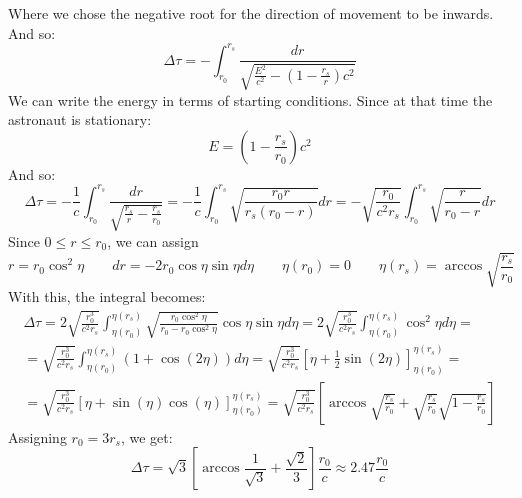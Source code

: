 \documentclass{article}
\begin{document}
Where we chose the negative root for the direction of movement to be inwards. And so:
\begin{equation}
    \Delta \tau = -\int_{r_0}^{r_s} \frac{dr}{\sqrt{\frac{E^2}{c^2} - \left(1 - \frac{r_s}{r}\right)c^2}}
\end{equation}
We can write the energy in terms of starting conditions. Since at that time the astronaut is stationary:
\begin{equation}
    E = \left(1 - \frac{r_s}{r_0}\right)c^2
\end{equation}
And so:
\begin{equation}
    \Delta \tau = -\frac{1}{c}\int_{r_0}^{r_s} \frac{dr}{\sqrt{\frac{r_s}{r} - \frac{r_s}{r_0}}} = -\frac{1}{c}\int_{r_0}^{r_s} \sqrt{\frac{r_0r}{r_s(r_0 - r)}}dr = 
    -\sqrt{\frac{r_0}{c^2r_s}}\int_{r_0}^{r_s} \sqrt{\frac{r}{r_0 - r}}dr
\end{equation}
Since $0 \le r \le r_0$, we can assign
\begin{equation}
    r = r_0 \cos^2 \eta
    \qquad
    dr = -2 r_0\cos\eta\sin\eta d\eta
    \qquad
    \eta(r_0) = 0
    \qquad
    \eta(r_s) = \arccos{\sqrt{\frac{r_s}{r_0}}}
\end{equation}
With this, the integral becomes:
\begin{equation}
\begin{gathered}
    \Delta \tau = 2\sqrt{\frac{r_0^3}{c^2r_s}}\int_{\eta(r_0)}^{\eta(r_s)} \sqrt{\frac{r_0\cos^2\eta}{r_0 - r_0\cos^2\eta}}\cos\eta\sin\eta d\eta
    = 2\sqrt{\frac{r_0^3}{c^2r_s}}\int_{\eta(r_0)}^{\eta(r_s)} \cos^2\eta d\eta = \\ =
    \sqrt{\frac{r_0^3}{c^2r_s}}\int_{\eta(r_0)}^{\eta(r_s)} \left(1 + \cos(2\eta)\right) d\eta =
    \sqrt{\frac{r_0^3}{c^2r_s}} \left[\eta + \frac{1}{2}\sin(2\eta)\right]_{\eta(r_0)}^{\eta(r_s)} = \\ = \sqrt{\frac{r_0^3}{c^2r_s}} \left[\eta + \sin(\eta)\cos(\eta)\right]_{\eta(r_0)}^{\eta(r_s)} =
    \sqrt{\frac{r_0^3}{c^2r_s}} \left[\arccos{\sqrt{\frac{r_s}{r_0}}} + \sqrt{\frac{r_s}{r_0}}\sqrt{1 - \frac{r_s}{r_0}}\right]
\end{gathered}
\end{equation}
Assigning $r_0 = 3r_s$, we get:
\begin{equation}
    \Delta \tau = \sqrt{3} \left[\arccos{\frac{1}{\sqrt{3}}} + \frac{\sqrt{2}}{3}\right]\frac{r_0}{c} \approx 2.47 \frac{r_0}{c}
\end{equation}
\end{document}
